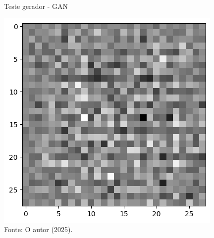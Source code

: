 \begin{figure}[H]
\centering
\caption{Teste gerador - GAN}
\includegraphics[width=.7\linewidth]{apendices/fig/9_IAA009_7.png}
\caption*{Fonte: O autor (2025).}
\end{figure}


